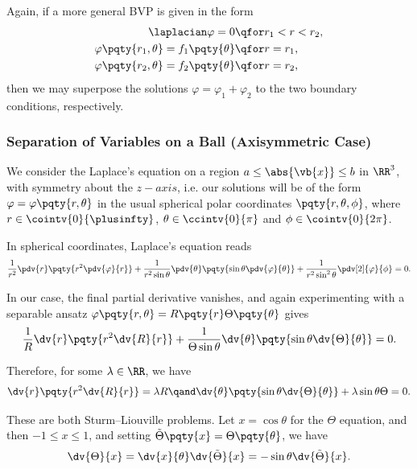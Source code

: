 {Again, if a more general BVP is given in the form
\begin{subequations}
    \begin{align}
        \laplacian \varphi = 0 &\qfor r_1 < r < r_2, \\
        \varphi\pqty{r_1, \theta} = f_1\pqty{\theta} &\qfor r = r_1, \\
        \varphi\pqty{r_2, \theta} = f_2\pqty{\theta} &\qfor r = r_2,
    \end{align}
\end{subequations}
then we may superpose the solutions \(\varphi = \varphi_1 + \varphi_2\) to the two boundary conditions, respectively.

\subsubsection{Separation of Variables on a Ball (Axisymmetric Case)}

We consider the Laplace's equation on a region \(a \leq \abs{\vb{x}} \leq b\) in \(\RR^3\), with symmetry about the \(z-axis\), i.e. our solutions will be of the form \(\varphi = \varphi\pqty{r, \theta}\) in the usual spherical polar coordinates \(\pqty{r, \theta, \phi}\), where \(r \in \cointv{0}{\plusinfty}\), \(\theta \in \ccintv{0}{\pi}\) and \(\phi \in \cointv{0}{2 \pi}\).

In spherical coordinates, Laplace's equation reads
\begin{equation}
    \frac{1}{r^2} \pdv{r} \pqty{r^2 \pdv{\varphi}{r}} + \frac{1}{r^2 \sin \theta} \pdv{\theta} \pqty{\sin \theta \pdv{\varphi}{\theta}} + \frac{1}{r^2 \sin^2 \theta} \pdv[2]{\varphi}{\phi} = 0.
\end{equation}

In our case, the final partial derivative vanishes, and again experimenting with a separable ansatz \(\varphi\pqty{r, \theta} = R\pqty{r} \Theta\pqty{\theta}\) gives
\begin{equation}
    \frac{1}{R} \dv{r} \pqty{r^2 \dv{R}{r}} + \frac{1}{\Theta \sin \theta} \dv{\theta} \pqty{\sin \theta \dv{\Theta}{\theta}} = 0.
\end{equation}

Therefore, for some \(\lambda \in \RR\), we have
\begin{equation}
    \dv{r} \pqty{r^2 \dv{R}{r}} = \lambda R \qand \dv{\theta} \pqty{\sin \theta \dv{\Theta}{\theta}} + \lambda \sin \theta \Theta = 0.
\end{equation}

These are both Sturm--Liouville problems. Let \(x = \cos \theta\) for the \(\Theta\) equation, and then \(-1 \leq x \leq 1\), and setting \(\tilde{\Theta} 
\pqty{x} = \Theta\pqty{\theta}\), we have
\begin{equation}
    \dv{\Theta}{x} = \dv{x}{\theta} \dv{\tilde{\Theta}}{x} = - \sin \theta \dv{\tilde{\Theta}}{x}.
\end{equation} 

}
